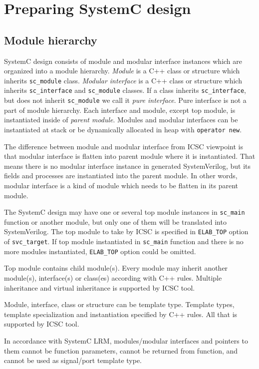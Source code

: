 \section{Preparing SystemC design}\label{section:prepare}

\subsection{Module hierarchy}\label{section:modules}

SystemC design consists of module and modular interface instances which are organized into a module hierarchy. \emph{Module} is a C++ class or structure which inherits {\tt sc\_module} class. \emph{Modular interface} is a C++ class or structure which inherits {\tt sc\_interface} and {\tt sc\_module} classes. If a class inherits {\tt sc\_interface}, but does not inherit {\tt sc\_module} we call it \emph{pure interface}. Pure interface is not a part of module hierarchy. Each interface and module, except top module, is instantiated inside of \emph{parent module}. Modules and modular interfaces can be instantiated at stack or be dynamically allocated in heap with {\tt operator new}.

The difference between module and modular interface from ICSC viewpoint is that modular interface is flatten into parent module where it is instantiated. That means there is no modular interface instance in generated SystemVerilog, but its fields and processes are instantiated into the parent module. In other words, modular interface is a kind of module which needs to be flatten in its parent module.

The SystemC design may have one or several top module instances in {\tt sc\_main} function or another module, but only one of them will be translated into SystemVerilog. The top module to take by ICSC is specified in {\tt ELAB\_TOP} option of {\tt svc\_target}. If top module instantiated in {\tt sc\_main} function and there is no more modules instantiated, {\tt ELAB\_TOP} option could be omitted.
 
Top module contains child module(s). Every module may inherit another module(s), interface(s) or class(es) according with C++ rules. Multiple inheritance and virtual inheritance is supported by ICSC tool.

Module, interface, class or structure can be template type. Template types, template specialization and instantiation specified by C++ rules. All that is supported by ICSC tool.

In accordance with SystemC LRM, modules/modular interfaces and pointers to them cannot be function parameters, cannot be returned from function, and cannot be used as signal/port template type. 


